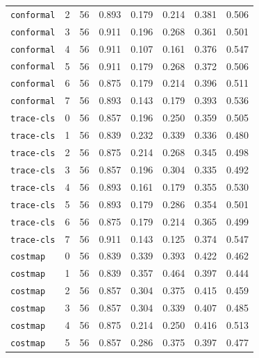 \documentclass{article}
\begin{document}
\begin{center}
{\begin{tabular}{lllccccc}
\texttt{conformal} & 2 & 56 & 0.893 & 0.179 & 0.214 & 0.381 & 0.506 \\
\texttt{conformal} & 3 & 56 & 0.911 & 0.196 & 0.268 & 0.361 & 0.501 \\
\texttt{conformal} & 4 & 56 & 0.911 & 0.107 & 0.161 & 0.376 & 0.547 \\
\texttt{conformal} & 5 & 56 & 0.911 & 0.179 & 0.268 & 0.372 & 0.506 \\
\texttt{conformal} & 6 & 56 & 0.875 & 0.179 & 0.214 & 0.396 & 0.511 \\
\texttt{conformal} & 7 & 56 & 0.893 & 0.143 & 0.179 & 0.393 & 0.536 \\
\texttt{trace-cls} & 0 & 56 & 0.857 & 0.196 & 0.250 & 0.359 & 0.505 \\
\texttt{trace-cls} & 1 & 56 & 0.839 & 0.232 & 0.339 & 0.336 & 0.480 \\
\texttt{trace-cls} & 2 & 56 & 0.875 & 0.214 & 0.268 & 0.345 & 0.498 \\
\texttt{trace-cls} & 3 & 56 & 0.857 & 0.196 & 0.304 & 0.335 & 0.492 \\
\texttt{trace-cls} & 4 & 56 & 0.893 & 0.161 & 0.179 & 0.355 & 0.530 \\
\texttt{trace-cls} & 5 & 56 & 0.893 & 0.179 & 0.286 & 0.354 & 0.501 \\
\texttt{trace-cls} & 6 & 56 & 0.875 & 0.179 & 0.214 & 0.365 & 0.499 \\
\texttt{trace-cls} & 7 & 56 & 0.911 & 0.143 & 0.125 & 0.374 & 0.547 \\
\texttt{costmap} & 0 & 56 & 0.839 & 0.339 & 0.393 & 0.422 & 0.462 \\
\texttt{costmap} & 1 & 56 & 0.839 & 0.357 & 0.464 & 0.397 & 0.444 \\
\texttt{costmap} & 2 & 56 & 0.857 & 0.304 & 0.375 & 0.415 & 0.459 \\
\texttt{costmap} & 3 & 56 & 0.857 & 0.304 & 0.339 & 0.407 & 0.485 \\
\texttt{costmap} & 4 & 56 & 0.875 & 0.214 & 0.250 & 0.416 & 0.513 \\
\texttt{costmap} & 5 & 56 & 0.857 & 0.286 & 0.375 & 0.397 & 0.477 \\
\bottomrule
\end{tabular}%
}
\end{center}
\end{document}
